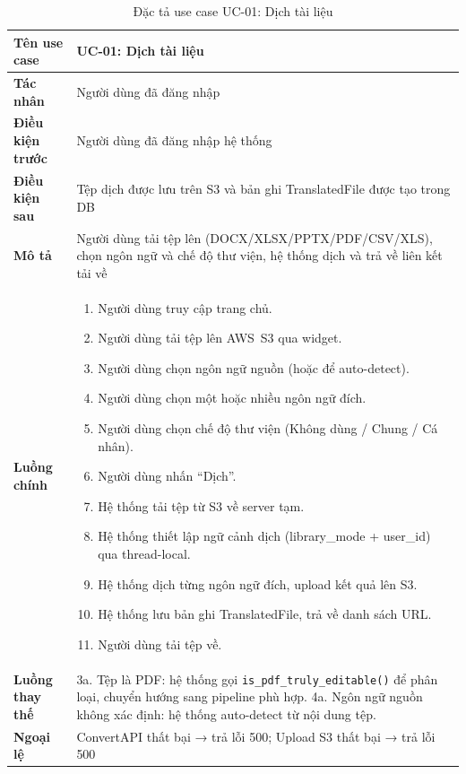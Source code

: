 \begin{table}[H]
\centering
\caption{Đặc tả use case UC-01: Dịch tài liệu}
\label{tab:uc01}
\renewcommand{\arraystretch}{1.3}
\begin{tabularx}{\textwidth}{|l|X|}
\hline
\textbf{Tên use case}     & UC-01: Dịch tài liệu \\
\hline
\textbf{Tác nhân}         & Người dùng đã đăng nhập \\
\hline
\textbf{Điều kiện trước}  & Người dùng đã đăng nhập hệ thống \\
\hline
\textbf{Điều kiện sau}    & Tệp dịch được lưu trên S3 và bản ghi TranslatedFile được tạo trong DB \\
\hline
\textbf{Mô tả}            & Người dùng tải tệp lên (DOCX/XLSX/PPTX/PDF/CSV/XLS), chọn ngôn ngữ và
                            chế độ thư viện, hệ thống dịch và trả về liên kết tải về \\
\hline
\textbf{Luồng chính}      &
\begin{enumerate}[leftmargin=*,nosep]
  \item Người dùng truy cập trang chủ.
  \item Người dùng tải tệp lên AWS~S3 qua widget.
  \item Người dùng chọn ngôn ngữ nguồn (hoặc để auto-detect).
  \item Người dùng chọn một hoặc nhiều ngôn ngữ đích.
  \item Người dùng chọn chế độ thư viện (Không dùng / Chung / Cá nhân).
  \item Người dùng nhấn ``Dịch''.
  \item Hệ thống tải tệp từ S3 về server tạm.
  \item Hệ thống thiết lập ngữ cảnh dịch (library\_mode + user\_id) qua thread-local.
  \item Hệ thống dịch từng ngôn ngữ đích, upload kết quả lên S3.
  \item Hệ thống lưu bản ghi TranslatedFile, trả về danh sách URL.
  \item Người dùng tải tệp về.
\end{enumerate} \\
\hline
\textbf{Luồng thay thế}  & 3a. Tệp là PDF: hệ thống gọi \texttt{is\_pdf\_truly\_editable()} để
                            phân loại, chuyển hướng sang pipeline phù hợp.
                            \newline
                            4a. Ngôn ngữ nguồn không xác định: hệ thống auto-detect từ nội dung
                            tệp. \\
\hline
\textbf{Ngoại lệ}        & ConvertAPI thất bại → trả lỗi 500; Upload S3 thất bại → trả lỗi 500 \\
\hline
\end{tabularx}
\end{table}

